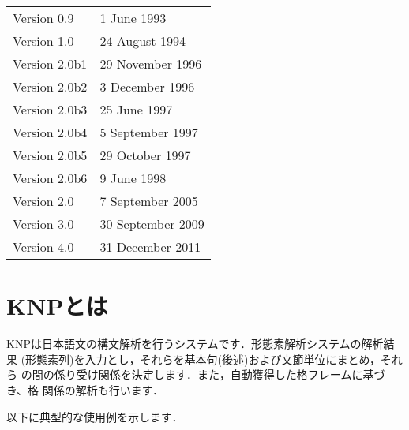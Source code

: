 \documentclass[a4j,11pt,titlepage]{jarticle}
\begin{document}
\begin{small}
\begin{tabular}{ll}
 Version 0.9 & 1 June 1993 \\
 Version 1.0 & 24 August 1994 \\
 Version 2.0b1 & 29 November 1996 \\
 Version 2.0b2 & 3 December 1996 \\
 Version 2.0b3 & 25 June 1997 \\
 Version 2.0b4 & 5 September 1997 \\
 Version 2.0b5 & 29 October 1997 \\
 Version 2.0b6 & 9 June 1998 \\
 Version 2.0 & 7 September 2005 \\
 Version 3.0 & 30 September 2009 \\
 Version 4.0 & 31 December 2011 \\
\end{tabular}
\end{small}

\clearpage

\tableofcontents

\clearpage
{}

\section{KNPとは}

KNPは日本語文の構文解析を行うシステムです．形態素解析システムの解析結果
(形態素列)を入力とし，それらを基本句(後述)および文節単位にまとめ，それら
の間の係り受け関係を決定します．また，自動獲得した格フレームに基づき、格
関係の解析も行います．

以下に典型的な使用例を示します．
\end{document}
